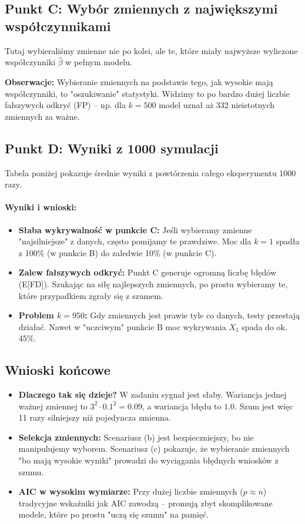 \documentclass[a4paper,12pt]{article}
\begin{document}
\subsection{Punkt C: Wybór zmiennych z największymi współczynnikami}
Tutaj wybieraliśmy zmienne nie po kolei, ale te, które miały najwyższe wyliczone współczynniki $\hat{\beta}$ w pełnym modelu.



\textbf{Obserwacje:}
Wybieranie zmiennych na podstawie tego, jak wysokie mają współczynniki, to "oszukiwanie" statystyki. Widzimy to po bardzo dużej liczbie fałszywych odkryć (FP) – np. dla $k=500$ model uznał aż 332 nieistotnych zmiennych za ważne.

\subsection{Punkt D: Wyniki z 1000 symulacji}
Tabela poniżej pokazuje średnie wyniki z powtórzenia całego eksperymentu 1000 razy.



\paragraph{Wyniki i wnioski:}
\begin{itemize}
    \item \textbf{Słaba wykrywalność w punkcie C:} Jeśli wybieramy zmienne "najsilniejsze" z danych, często pomijamy te prawdziwe. Moc dla $k=1$ spadła z 100\% (w punkcie B) do zaledwie 10\% (w punkcie C).
    \item \textbf{Zalew fałszywych odkryć:} Punkt C generuje ogromną liczbę błędów (E[FD]). Szukając na siłę najlepszych zmiennych, po prostu wybieramy te, które przypadkiem zgrały się z szumem.
    \item \textbf{Problem $k=950$:} Gdy zmiennych jest prawie tyle co danych, testy przestają działać. Nawet w "uczciwym" punkcie B moc wykrywania $X_1$ spada do ok. 45\%.
\end{itemize}

\subsection{Wnioski końcowe}
\begin{itemize}
    \item \textbf{Dlaczego tak się dzieje?} W zadaniu sygnał jest słaby. Wariancja jednej ważnej zmiennej to $3^2 \cdot 0.1^2 = 0.09$, a wariancja błędu to $1.0$. Szum jest więc 11 razy silniejszy niż pojedyncza zmienna.
    \item \textbf{Selekcja zmiennych:} Scenariusz (b) jest bezpieczniejszy, bo nie manipulujemy wyborem. Scenariusz (c) pokazuje, że wybieranie zmiennych "bo mają wysokie wyniki" prowadzi do wyciągania błędnych wniosków z szumu.
    \item \textbf{AIC w wysokim wymiarze:} Przy dużej liczbie zmiennych ($p \approx n$) tradycyjne wskaźniki jak AIC zawodzą – promują zbyt skomplikowane modele, które po prostu "uczą się szumu" na pamięć.
\end{itemize}
\end{document}
